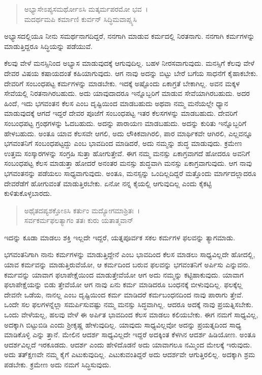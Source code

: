 \begin{verse}
ಅಭ್ಯಾಸೇಽಪ್ಯಸಮರ್ಥೋಽಸಿ ಮತ್ಕರ್ಮಪರಮೋ ಭವ~।\\ಮದರ್ಥಮಪಿ ಕರ್ಮಾಣಿ ಕುರ್ವನ್ ಸಿದ್ಧಿಮವಾಪ್ಸ್ಯಸಿ 
\end{verse}

{\small ಅಭ್ಯಾಸದಲ್ಲಿಯೂ ನೀನು ಸಮರ್ಥನಾಗದಿದ್ದರೆ, ನನಗಾಗಿ ಮಾಡುವ ಕರ್ಮದಲ್ಲಿ ನಿರತನಾಗು. ನನಗಾಗಿ ಕರ್ಮಗಳನ್ನು ಮಾಡುತ್ತಿದ್ದರೂ ಸಿದ್ಧಿಯನ್ನು ಪಡೆಯುವೆ.}

ಕೆಲವು ವೇಳೆ ಮನಸ್ಸಿನಿಂದ ಅಭ್ಯಾಸ ಮಾಡುವುದಕ್ಕೆ ಆಗುವುದಿಲ್ಲ. ಬಹಳ ನೀರಸವಾಗುವುದು. ಮನಸ್ಸಿಗೆ ಕೆಲವು ವೇಳೆ ದೇವರ ವಿಷಯ ಕಷಾಯದಂತೆ ಕಹಿಯಾಗುವುದು. ಆಗ ನಾವು ಅದನ್ನು ಬಿಟ್ಟು ಬೇರೆ ಬಗೆಯ ಸಾಧನೆಗೆ ಕೈಹಾಕಬೇಕು. ದೇವರಿಗೆ ಸಂಬಂಧಪಟ್ಟ ಕರ್ಮಗಳನ್ನು ಮಾಡಬೇಕು. ಇದಕ್ಕೆ ಅಷ್ಟೊಂದು ಏಕಾಗ್ರತೆ ಬೇಕಾಗಿಲ್ಲ. ಅವನ ಮಕ್ಕಳ ಸೇವೆಯಲ್ಲಿ ನಿರತನಾಗಿರಬಹುದು. ಅದು ಯಾವುದಾದರೂ ಇನ್ನೊಬ್ಬರಿಗೆ ಮಾಡುವ ಸೇವೆಯಾಗಿರಬಹುದು. ಅದರ ಹಿಂದೆ, ಇದು ಭಗವಂತನ ಕೆಲಸ ಎಂಬ ದೃಷ್ಟಿಯಿಂದ ಮಾಡಬಹುದು ಅಥವಾ ನಮ್ಮ ಮನೆಯಲ್ಲೇ ಧ್ಯಾನ ಮಾಡುವುದಕ್ಕೆ ಆಗದೆ ಇದ್ದರೆ ದೇವರ ಪೂಜೆಗೆ ಸಂಬಂಧಪಟ್ಟ ಇತರ ಕೆಲಸಗಳನ್ನು ಮಾಡಬಹುದು. ದೇವರಿಗೆ ಸಂಬಂಧಪಟ್ಟ ಗ್ರಂಥಗಳನ್ನು ಓದಬಹುದು. ಅದನ್ನು ಪಾರಾಯಣ ಮಾಡಬಹುದು. ಅದನ್ನು ಕುರಿತು ಇನ್ನೊಬ್ಬರಿಗೆ ಹೇಳಬಹುದು. ಅಂತೂ ಯಾವ ಕೆಲಸವೇ ಆಗಲಿ, ಅದು ಲೌಕಿಕವಾಗಿರಲಿ, ಪಾರ ಮಾರ್ಥಿಕವೇ ಆಗಿರಲಿ, ಎಲ್ಲವನ್ನೂ ಭಗವಂತನಿಗೆ ಸಂಬಂಧಪಟ್ಟದ್ದು ಎಂಬ ಭಾವದಿಂದ ಮಾಡಿದರೆ, ಅದು ನಮ್ಮನ್ನು ಶುದ್ಧ ಮಾಡುವುದು. ಕ್ರಮೇಣ ಉತ್ತಮ ಸಂಸ್ಕಾರಗಳನ್ನು ಸಂಗ್ರಹಿ ಸುತ್ತಾ ಹೋಗುತ್ತೇವೆ. ಈಗ ನಮ್ಮ ಮನಸ್ಸು ಏಕಾಗ್ರವಾಗದೆ ಹೋದರೂ ಅವನಿಗೆ ಸಂಬಂಧಪಟ್ಟ ಕೆಲಸ ಮಾಡುತ್ತಾ ಹೋದರೆ ಅನಂತರ ಮನಸ್ಸು ಶುದ್ಧವಾಗಿ ಮನಸ್ಸು ಏಕಾಗ್ರವಾಗುವುದು. ಆಗ ನಾವು ಭಗವಂತನನ್ನು ಪಡೆಯಲು ಸಾಧ್ಯವಾಗುವುದು. ಅಂತೂ, ಮನಸ್ಸನ್ನು ಒಂದಿಲ್ಲದಿದ್ದರೆ ಮತ್ತೊಂದು ಮಾರ್ಗದಲ್ಲಾದರೂ ದೇವರೆಡೆಗೆ ಹೋಗುವಂತೆ ಮಾಡುತ್ತಿರಬೇಕು. ಏನೋ ನನ್ನ ಕೈಯಲ್ಲಿ ಆಗುವುದಿಲ್ಲ ಎಂದು ಕೈಕಟ್ಟಿ ಕುಳಿತುಕೊಳ್ಳಬಾರದು.

\begin{verse}
ಅಥೈತದಪ್ಯಶಕ್ತೋಽಸಿ ಕರ್ತುಂ ಮದ್ಯೋಗಮಾಶ್ರಿತಃ~।\\ಸರ್ವಕರ್ಮಫಲತ್ಯಾಗಂ ತತಃ ಕುರು ಯತಾತ್ಮವಾನ್ 
\end{verse}

{\small ಇದನ್ನು ಕೂಡಾ ಮಾಡಲು ಶಕ್ತಿ ಇಲ್ಲದೇ ಇದ್ದರೆ, ಯತ್ನಪೂರ್ವಕ ಸಕಲ ಕರ್ಮಗಳ ಫಲವನ್ನು ತ್ಯಾಗಮಾಡು.}

ಭಗವಂತನಿಗಾಗಿ ನಾನು ಕರ್ಮಗಳನ್ನು ಮಾಡುತ್ತಿದ್ದೇನೆ ಎಂಬ ಭಾವದಿಂದ ಕೆಲಸ ಮಾಡಲು ಸಾಧ್ಯವಿಲ್ಲದೇ ಹೋದಲ್ಲಿ, ಯಾವ ಕರ್ಮವನ್ನು ಮಾಡುತ್ತಿರುವೆಯೋ, ಆ ಕರ್ಮದಿಂದ ಬರುವ ಫಲವನ್ನು ಭಗವಂತನಿಗೆ ಅರ್ಪಿಸು ಎನ್ನುವನು. ಕರ್ಮವನ್ನು ಯಾವಾಗ ಫಲಾಪೇಕ್ಷೆಯಿಂದ ಮಾಡುತ್ತೇವೆಯೋ ಆಗ ಅದು ನಮ್ಮನ್ನು ಕಟ್ಟಿಹಾಕುವುದು. ಯಾವಾಗ ಫಲಾಪೇಕ್ಷೆಯನ್ನು ಬಿಡು ತ್ತೇವೆಯೋ ಆಗ ನಾವು ಏನು ಕರ್ಮ ಮಾಡಿದರೂ ಬಂಧನಕ್ಕೆ ಬೀಳುವುದಿಲ್ಲ. ಫಲಕ್ಕೆಲ್ಲ ದೇವನೇ ಒಡೆಯ, ನಾನಲ್ಲ ಎಂಬ ದೃಷ್ಟಿಯಿಂದ ಕರ್ಮ ಮಾಡಿದರೆ ಕರ್ಮಬಂಧನದಿಂದ ನಾವು ಪಾರಾಗು ತ್ತೇವೆ. ಒಂದೇ ಸಲ ಫಲಗಳನ್ನೆಲ್ಲಾ ಸಮರ್ಪಿಸುವಷ್ಟು ನಮ್ಮ ಮನಸ್ಸು ಸಿದ್ಧವಾಗಿಲ್ಲ. ಆದರೂ ಅದಕ್ಕೆ ನಾವು ಪ್ರಯತ್ನಿಸಬೇಕು. ಒಂದು ವೇಳೆಯಲ್ಲ, ಹಲವು ವೇಳೆ ಈ ಅರ್ಪಿತ ಭಾವದಿಂದ ಕೆಲಸ ಮಾಡಲು ಕಲಿಯಬೇಕು. ಈಗ ನಮಗೆ ಸಾಧ್ಯವಿಲ್ಲ, ಅದಕ್ಕಾಗಿ ಬಿಟ್ಟುಬಿಡಿ ಎಂದು ಶ‍್ರೀಕೃಷ್ಣ ಹೇಳುವುದಿಲ್ಲ. ಯಾವುದು ಸಾಧ್ಯವಿಲ್ಲವೋ ಅದನ್ನು ಪ್ರಯತ್ನದಿಂದ ಸಾಧ್ಯ ಮಾಡಿಕೊಳ್ಳಿ ಎನ್ನು ತ್ತಾನೆ. ಮೇಲಿನ ಆದರ್ಶ ಸಾಧ್ಯವಿಲ್ಲದೇ ಇದ್ದರೆ ಅದಕ್ಕಿಂತ ಕೆಳಗಿನ ಆದರ್ಶ ಹಿಡಿಯೋಣ. ಅಂತೂ ಆದರ್ಶವಿಲ್ಲದೆ ಇರಕೂಡದು. ಆದರ್ಶ ಎಂದು ಹೇಳಿದೊಡನೆ ಅದು ಯಾವಾಗಲೂ ನಮ್ಮಿಂದ ಮೇಲಕ್ಕೆ ಇರುವುದು. ಅದು ತತ್​ಕ್ಷಣವೇ ನಮ್ಮ ಕೈಗೆ ಎಟುಕುವುದಿಲ್ಲ. ಎಟುಕುವಂತಿದ್ದರೆ ಅದು ಆದರ್ಶವೇ ಆಗುತ್ತಿರಲಿಲ್ಲ. ಅದಕ್ಕಾಗಿ ಶ್ರಮ ಪಡಬೇಕು. ಕ್ರಮೇಣ ಅದು ನಮಗೆ ಸಿದ್ಧಿಸುವುದು.

